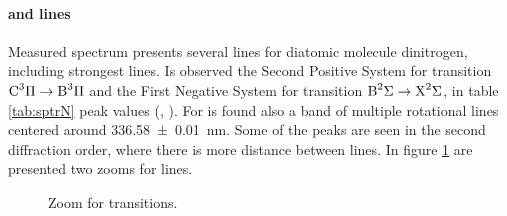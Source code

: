 \paragraph{ and  lines}
Measured spectrum presents several lines for diatomic molecule dinitrogen, including strongest lines. Is observed the Second Positive System for  transition $\ce{C^3\Pi} \rightarrow \ce{B^3\Pi}$ and the First Negative System for  transition $\ce{B^2\Sigma} \rightarrow \ce{X^2\Sigma}$, in table \ref{tab:sptrN} peak values (\cite{N2lab}, \cite{Britun_2007}). For  is found also a band of multiple rotational lines centered around \SI{336.58(1)}{\nano\meter}.
Some of the peaks are seen in the second diffraction order, where there is more distance between lines. In figure \ref{fig:N2} are presented two zooms for  lines.
\begin{figure}
 \centering
 \hfill
 \caption{Zoom for  transitions.}
 \label{fig:N2}
\end{figure}

